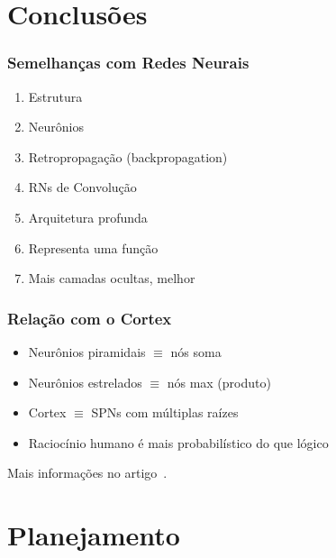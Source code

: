 \documentclass[10pt]{beamer}
\theoremstyle{plain}
\begin{document}
\section{Conclusões}

\begin{frame}
  \frametitle{Semelhanças com Redes Neurais}

  \begin{enumerate}
    \item Estrutura
    \item Neurônios
    \item Retropropagação (backpropagation)
    \item RNs de Convolução
    \item Arquitetura profunda
    \item Representa uma função
    \item Mais camadas ocultas, melhor
  \end{enumerate}
\end{frame}

\begin{frame}
  \frametitle{Relação com o Cortex}

  \begin{itemize}
    \item Neurônios piramidais $\equiv$ nós soma
    \item Neurônios estrelados $\equiv$ nós max (produto)
    \item Cortex $\equiv$ SPNs com múltiplas raízes
    \item Raciocínio humano é mais probabilístico do que lógico
  \end{itemize}

  Mais informações no artigo~\cite{poon-domingos}.
\end{frame}


\section{Planejamento}
\end{document}
